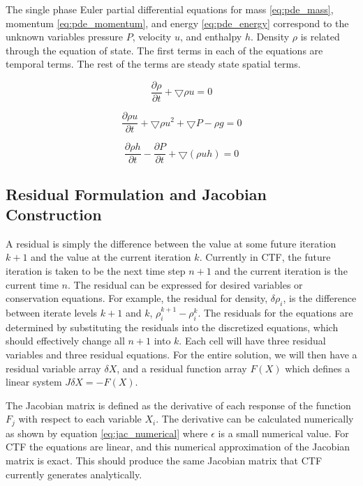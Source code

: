 \documentclass{mc2015}
\begin{document}
The single phase Euler partial differential equations for mass
\eqref{eq:pde_mass}, momentum \eqref{eq:pde_momentum}, and energy
\eqref{eq:pde_energy} correspond to the unknown variables pressure $P$,
velocity $u$, and enthalpy $h$. Density $\rho$ is related through the equation
of state. The first terms in each of the equations are temporal terms. The rest
of the terms are steady state spatial terms. 
    
    \begin{equation}
    	\label{eq:pde_mass}
    	\frac{ \partial \rho}{\partial t} + \bigtriangledown \rho u = 0
    \end{equation}
    
    \begin{equation}
    	\label{eq:pde_momentum}
    	\frac{ \partial \rho u}{\partial t} + \bigtriangledown \rho u^{2} +
    	\bigtriangledown P - \rho g  = 0
    \end{equation}
    
    \begin{equation}
    	\label{eq:pde_energy}
    	\frac{ \partial \rho h}{\partial t} -
    	\frac{ \partial  P}{\partial t} + 
    	\bigtriangledown ( \rho  u h )
    	= 0
    \end{equation}

\subsection{Residual Formulation and Jacobian Construction}

	A residual is simply the difference between the value at some future iteration
    $k+1$ and the value at the current iteration $k$. Currently in CTF, the
    future iteration is taken to be the next time step $n+1$ and the
    current iteration is the current time $n$. The residual can be expressed for
    desired variables or conservation equations. For example, the residual for
    density, $\delta \rho_{i}$, is the difference between iterate levels $k+1$
    and $k$, $\rho^{k+1}_{i} - \rho^{k}_{i}$. The residuals for the equations
    are determined by substituting the residuals into the discretized equations,
    which should effectively change all $n+1$ into $k$. Each cell will have
    three residual variables and three residual equations. For the entire
    solution, we will then have a residual variable array $\delta X$, and a
    residual function array $F(X)$ which defines a linear system $J \delta X = - F(X)$.
    
    The Jacobian matrix is defined as the derivative
    of each response of the function $F_{j}$ with respect to each variable $X_{i}$.
    The derivative can be calculated numerically as shown by equation
    \eqref{eq:jac_numerical} where $\epsilon$ is a small numerical value. For
    CTF the equations are linear, and this numerical approximation
    of the Jacobian matrix is exact. This should produce the same Jacobian
    matrix that CTF currently generates analytically. 
    
\end{document}
